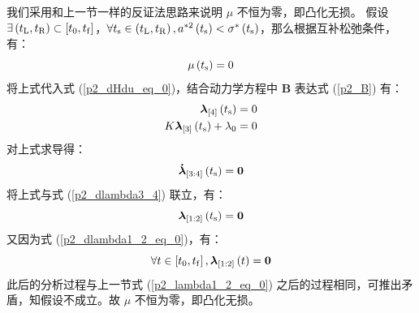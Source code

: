 \documentclass{article}
\numberwithin{equation}{section}
\begin{document}
我们采用和上一节一样的反证法思路来说明 $\mu$ 不恒为零，即凸化无损。
假设 $\exists \left(t_{\rm{L}}, t_{\rm{R}}\right) \subset \left[ {{t_0},{t_{\rm{f}}}} \right]$，$\forall t_{\rm{s}} \in \left( {{t_{\rm{L}}},{t_{\rm{R}}}} \right), a^{*2}\left(t_{\rm{s}}\right) < \sigma^*\left(t_{\rm{s}}\right)$，那么根据互补松弛条件，有：
\[\mu\left(t_{\rm{s}}\right) = 0\]
将上式代入式 (\ref{p2_dHdu_eq_0})，结合动力学方程中 $\bm{B}$ 表达式 (\ref{p2_B}) 有：
\[\begin{aligned}
{{\bm{\lambda }}_{\left[ 4 \right]}}\left( {{t_{\rm{s}}}} \right) &= 0\\
K{{\bm{\lambda }}_{\left[ 3 \right]}}\left( {{t_{\rm{s}}}} \right) + {\lambda _0} &= 0
\end{aligned}\]
对上式求导得：
\[{{{\bm{\dot \lambda }}}_{\left[ {3:4} \right]}}\left( {{t_{\rm{s}}}} \right) = {\bf{0}}\]
将上式与式 (\ref{p2_dlambda3_4}) 联立，有：
\[{{\bm{\lambda }}_{\left[ {1:2} \right]}}\left( {{t_{\rm{s}}}} \right) = {\bf{0}}\]
又因为式 (\ref{p2_dlambda1_2_eq_0})，有：
\[\forall t \in \left[ {{t_0},{t_{\rm{f}}}} \right],{{\bm{\lambda }}_{\left[ {1:2} \right]}}\left( t \right) = {\bf{0}}\]
此后的分析过程与上一节式 (\ref{p2_lambda1_2_eq_0}) 之后的过程相同，可推出矛盾，知假设不成立。故 $\mu$ 不恒为零，即凸化无损。
\end{document}
